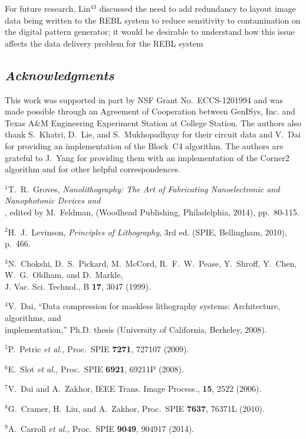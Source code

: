 \documentclass{article}
\begin{document}
For future research, Lin$^{43}$ discussed the need
to add redundancy to layout image data being written to the REBL system
to reduce sensitivity to contamination on the digital pattern generator;
it would be desirable to understand how this issue affects the data delivery
problem for the REBL system

\subsection*{{\em Acknowledgments}}
This work was supported in part by NSF Grant No.~ECCS-1201994
and was made possible through an Agreement of
Cooperation between GenISys, Inc. and Texas A\&M Engineering Experiment
Station at College Station.  The authors also thank S.~Khatri, D.~Lie, and
S.~Mukhopadhyay for their circuit data and V.~Dai for providing an
implementation of the Block~C4 algorithm.  The authors are grateful to
J.~Yang for providing them with an implementation of the Corner2 algorithm
and for other helpful correspondences.

\noindent $^1$T.~R.~Groves, {\em Nanolithography: The Art of Fabricating 
Nanoelectronic and Nanophotonic Devices and} \\
, edited by
M.~Feldman, (Woodhead Publishing, Philadelphia, 2014), pp.~80-115.

\noindent $^2$H.~J.~Levinson, {\em Principles of Lithography}, 3rd ed.
(SPIE, Bellingham, 2010), p.~466.

\noindent $^3$N.~Chokshi, D.~S.~Pickard, M.~McCord, R.~F.~W.~Pease, Y.~Shroff,
Y.~Chen, W.~G.~Oldham, and D.~Markle, \\
\indent J. Vac. Sci. Technol., B {\bf 17}, 3047 (1999).

\noindent $^4$V.~Dai, ``Data compression for maskless lithography systems: Architecture, algorithms, and \\
\indent implementation,'' Ph.D. thesis (University of California, Berkeley, 
2008).

\noindent $^5$P.~Petric \emph{et al.,} Proc.~SPIE {\bf 7271}, 727107 (2009).

\noindent $^6$E.~Slot \emph{et al.,} Proc.~SPIE {\bf 6921}, 69211P (2008).

\noindent $^7$V.~Dai and A.~Zakhor, 
IEEE Trans. Image Process., {\bf 15}, 2522 (2006).

\noindent $^8$G.~Cramer, H.~Liu, and A.~Zakhor,
Proc.~SPIE {\bf 7637}, 76371L (2010).

\noindent $^9$A.~Carroll \emph{et al.,} Proc.~SPIE {\bf 9049}, 904917 (2014).
\end{document}
